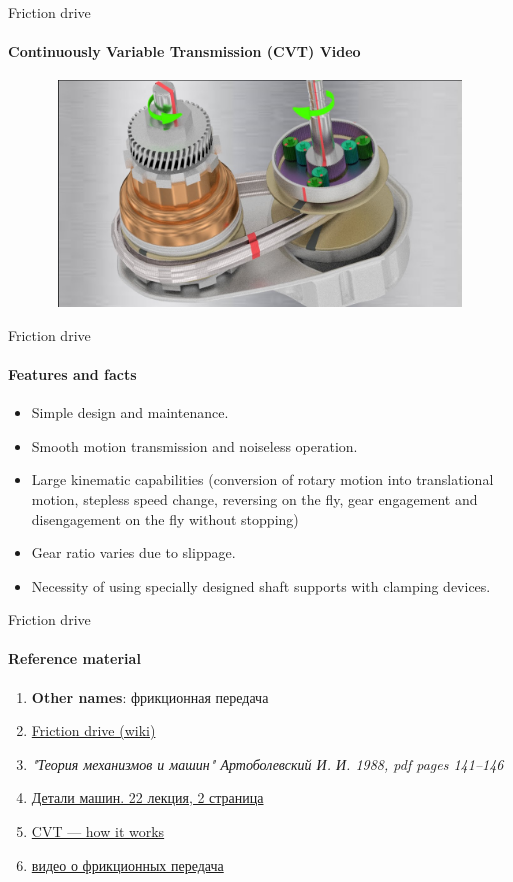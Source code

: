 \documentclass[aspectratio=169]{beamer}
\begin{document}
\begin{frame}[t]{Friction drive}
    \framesubtitle{Continuously Variable Transmission (CVT) Video}
    \vspace{-0.6cm}
    \begin{figure}[H]
        \href{https://youtu.be/PEq5_b4LWNY}{
            \centering\includegraphics[height=6cm,width=1\textwidth,keepaspectratio]{friction_variator_preview.jpg}}
        \label{fig:friction_variator_preview.jpg}
    \end{figure}
\end{frame}

\begin{frame}[t]{Friction drive}
    \framesubtitle{Features and facts}
    \begin{itemize}
        \item Simple design and maintenance.
        \item Smooth motion transmission and noiseless operation.
        \item Large kinematic capabilities (conversion of rotary motion into translational motion, stepless speed change, reversing on the fly, gear engagement and disengagement on the fly without stopping)
        \item Gear ratio varies due to slippage.
        \item Necessity of using specially designed shaft supports with clamping devices.
    \end{itemize}
\end{frame}

\begin{frame}[t]{Friction drive}
    \framesubtitle{Reference material}
    \begin{enumerate}
        \item \textbf{Other names}: фрикционная передача
        \item \href{https://en.m.wikipedia.org/wiki/Friction_drive}{Friction drive (wiki)}
        \item \textit{"Теория механизмов и машин" Артоболевский И. И. 1988, pdf pages 141--146 }
        \item \href{https://studfile.net/preview/2156467/page:2/}{Детали машин. 22 лекция, 2 страница}
        \item \href{https://www.youtube.com/watch?v=uCEvBGT8twM}{CVT --- how it works}
        \item \href{https://youtu.be/H1Dde7frZx8}{видео о фрикционных передача}
    \end{enumerate}
\end{frame}
\end{document}
